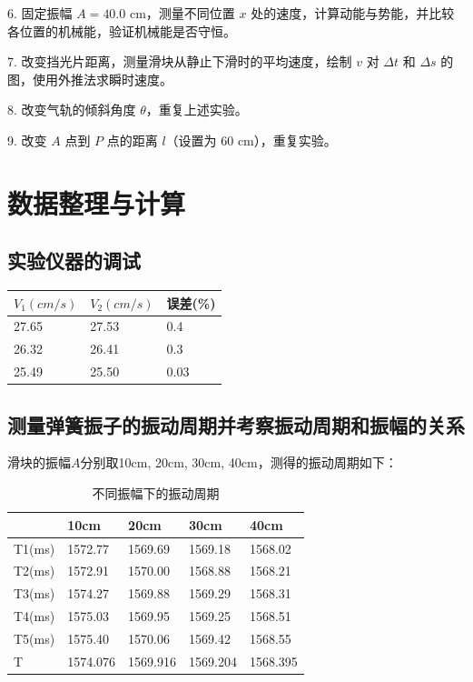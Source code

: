 \documentclass[zihao=5, UTF8]{article}
\theoremstyle{MyLineTheoremStyle} %
\theoremstyle{MyBlockTheoremStyle} %
\theoremstyle{MySubsubsectionStyle} %
\begin{document}
6. 固定振幅 $A = 40.0$ cm，测量不同位置 $x$ 处的速度，计算动能与势能，并比较各位置的机械能，验证机械能是否守恒。

7. 改变挡光片距离，测量滑块从静止下滑时的平均速度，绘制 $v$ 对 $\Delta t$ 和 $\Delta s$ 的图，使用外推法求瞬时速度。

8. 改变气轨的倾斜角度 $\theta$，重复上述实验。

9. 改变 $A$ 点到 $P$ 点的距离 $l$（设置为 $60$ cm），重复实验。

\section{数据整理与计算}

\subsection{实验仪器的调试}
\begin{table}[H]
  \centering
	\begin{tabular}{|l|l|l|}
		\hline
		$V_1(cm/s)$  & $V_2(cm/s)$  & 误差(\%)          \\ \hline
		27.65 & 27.53 & 0.4 \\ \hline
		26.32 & 26.41 & 0.3 \\ \hline
		25.49 & 25.50  & 0.03  \\ \hline
	\end{tabular}
\end{table}

\subsection{测量弹簧振子的振动周期并考察振动周期和振幅的关系}
滑块的振幅$A$分别取10cm, 20cm, 30cm, 40cm，测得的振动周期如下：
\begin{table}[H]
  \centering
	\begin{tabular}{|l|l|l|l|l|}
		\hline
		& 10cm     & 20cm     & 30cm     & 40cm    \\ \hline
		T1(ms) & 1572.77  & 1569.69  & 1569.18  & 1568.02 \\ \hline
		T2(ms) & 1572.91  & 1570.00  & 1568.88  & 1568.21 \\ \hline
		T3(ms) & 1574.27  & 1569.88  & 1569.29  & 1568.31  \\ \hline
		T4(ms) & 1575.03  & 1569.95  & 1569.25  & 1568.51 \\ \hline
		T5(ms) & 1575.40  & 1570.06  & 1569.42  & 1568.55 \\ \hline
		T      & 1574.076 & 1569.916 & 1569.204 & 1568.395 \\ \hline
	\end{tabular}
  \caption{不同振幅下的振动周期}
  \label{tab:不同振幅下的振动周期}
\end{table}
\end{document}
